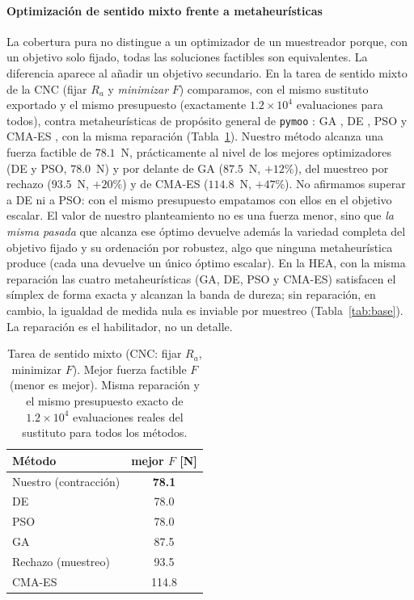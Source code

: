 \documentclass[5p,times,authoryear]{elsarticle}
\begin{document}
\paragraph{Optimización de sentido mixto frente a metaheurísticas} La cobertura pura
no distingue a un optimizador de un muestreador porque, con un objetivo solo fijado,
todas las soluciones factibles son equivalentes. La diferencia aparece al añadir un
objetivo secundario. En la tarea de sentido mixto de la CNC (fijar $R_a$ y
\emph{minimizar} $F$) comparamos, con el mismo sustituto exportado y el mismo
presupuesto (exactamente $1.2\times10^4$ evaluaciones para todos), contra metaheurísticas
de propósito general de \texttt{pymoo} \citep{blank2020pymoo}: GA \citep{goldberg1989ga},
DE \citep{storn1997de}, PSO \citep{kennedy1995pso} y CMA-ES \citep{hansen2001cmaes}, con
la misma reparación (Tabla~\ref{tab:mixed}). Nuestro método alcanza una fuerza factible de $78.1$~N,
prácticamente al nivel de los mejores optimizadores (DE y PSO, $78.0$~N) y por delante de
GA ($87.5$~N, $+12\%$), del muestreo por rechazo ($93.5$~N, $+20\%$) y de CMA-ES
($114.8$~N, $+47\%$). No afirmamos superar a DE ni a PSO: con el mismo presupuesto
empatamos con ellos en el objetivo escalar. El valor de nuestro planteamiento no es una
fuerza menor, sino que \emph{la misma pasada} que alcanza ese óptimo devuelve además la
variedad completa del objetivo fijado y su ordenación por robustez, algo que ninguna
metaheurística produce (cada una devuelve un único óptimo escalar). En la HEA, con la misma
reparación las cuatro metaheurísticas (GA, DE, PSO y CMA-ES) satisfacen el símplex de forma
exacta y alcanzan la banda de dureza; sin reparación, en cambio, la igualdad de medida nula
es inviable por muestreo (Tabla~\ref{tab:base}). La reparación es el habilitador, no un
detalle.

\begin{table}[t]
\centering
\caption{Tarea de sentido mixto (CNC: fijar $R_a$, minimizar $F$). Mejor fuerza factible
$F$ (menor es mejor). Misma reparación y el mismo presupuesto exacto de $1.2\times10^4$
evaluaciones reales del sustituto para todos los métodos.}
\label{tab:mixed}
\begin{tabular}{lc}
\toprule
Método & mejor $F$ [N] \\
\midrule
Nuestro (contracción) & \textbf{78.1} \\
DE                  & 78.0 \\
PSO                 & 78.0 \\
GA                  & 87.5 \\
Rechazo (muestreo)  & 93.5 \\
CMA-ES              & 114.8 \\
\bottomrule
\end{tabular}
\end{table}
\end{document}
